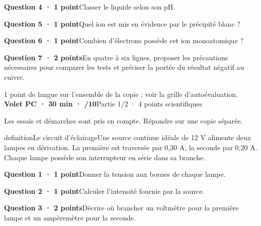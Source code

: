 \par\addvspace{3mm}\noindent\textbf{Question 4 · 1 point}\quad Classer le liquide selon son pH.\par
\par\addvspace{3mm}\noindent\textbf{Question 5 · 1 point}\quad Quel ion est mis en évidence par le précipité blanc ?\par
\par\addvspace{3mm}\noindent\textbf{Question 6 · 1 point}\quad Combien d’électrons possède cet ion monoatomique ?\par
\par\addvspace{3mm}\noindent\textbf{Question 7 · 2 points}\quad En quatre à six lignes, proposer les précautions nécessaires pour comparer les tests et préciser la portée du résultat négatif au cuivre.\par
\vfill{}
{\small 1 point de langue sur l’ensemble de la copie : voir la grille d’autoévaluation.}
\label{bb-3}
\noindent\textbf{Volet PC · 30 min · /10}\hfill Partie 1/2 · 4 points scientifiques
\par\vspace{2mm}Les essais et démarches sont pris en compte. Répondre sur une copie séparée.\par
\begin{pcEncadre}{definition}{Le circuit d’éclairage}Une source continue idéale de 12 V alimente deux lampes en dérivation. La première est traversée par 0,30 A, la seconde par 0,20 A. Chaque lampe possède son interrupteur en série dans sa branche.\end{pcEncadre}
\par\addvspace{3mm}\noindent\textbf{Question 1 · 1 point}\quad Donner la tension aux bornes de chaque lampe.\par
\par\addvspace{3mm}\noindent\textbf{Question 2 · 1 point}\quad Calculer l’intensité fournie par la source.\par
\par\addvspace{3mm}\noindent\textbf{Question 3 · 2 points}\quad Décrire où brancher un voltmètre pour la première lampe et un ampèremètre pour la seconde.\par

